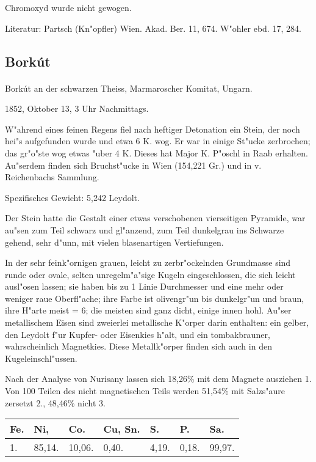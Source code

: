\documentclass[a4paper, 11pt, oneside]{article}
\begin{document}
Chromoxyd wurde nicht gewogen.

\footnotesize
Literatur: Partsch (Kn"opfler) Wien. Akad. Ber. 11, 674. W"ohler ebd. 17, 284.

\subsection{Borkút}
\normalsize
\paragraph{}
Borkút an der schwarzen Theiss, Marmaroscher Komitat, Ungarn.

1852, Oktober 13, 3 Uhr Nachmittags.

W"ahrend eines feinen Regens fiel nach heftiger Detonation ein Stein, der noch hei"s aufgefunden wurde und etwa 6 K. wog. Er war in einige St"ucke zerbrochen; das gr"o"ste wog etwas "uber 4 K. Dieses hat Major K. P"oschl in Raab erhalten. Au"serdem finden sich Bruchst"ucke in Wien (154,221 Gr.) und in v. Reichenbachs Sammlung.

Spezifisches Gewicht: 5,242 Leydolt.

Der Stein hatte die Gestalt einer etwas verschobenen vierseitigen Pyramide, war au"sen zum Teil schwarz und gl"anzend, zum Teil dunkelgrau ins Schwarze gehend, sehr d"unn, mit vielen blasenartigen Vertiefungen.

In der sehr feink"ornigen grauen, leicht zu zerbr"ockelnden Grundmasse sind runde oder ovale, selten unregelm"a"sige Kugeln eingeschlossen, die sich leicht ausl"osen lassen; sie haben bis zu 1 Linie Durchmesser und eine mehr oder weniger raue Oberfl"ache; ihre Farbe ist olivengr"un bis dunkelgr"un und braun, ihre H"arte meist = 6; die meisten sind ganz dicht, einige innen hohl. Au"ser metallischem Eisen sind zweierlei metallische K"orper darin enthalten: ein gelber, den Leydolt f"ur Kupfer- oder Eisenkies h"alt, und ein tombakbrauner, wahrscheinlich Magnetkies. Diese Metallk"orper finden sich auch in den Kugeleinschl"ussen.

Nach der Analyse von Nurisany lassen sich 18,26\% mit dem Magnete ausziehen 1. Von 100 Teilen des nicht magnetischen Teils werden 51,54\% mit Salzs"aure zersetzt 2., 48,46\% nicht 3.
\begin{table}[H]
    \centering
    \footnotesize
    \begin{tabular}{l l l l l l l}
        Fe. & Ni, & Co. & Cu, Sn. & S. & P. & Sa. \\ \hline
        1. & 85,14. & 10,06. & 0,40. & 4,19. & 0,18. & 99,97. \\
    \end{tabular}
\end{table}
\end{document}
